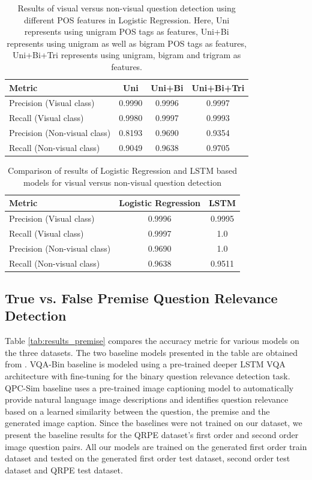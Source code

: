 \begin{table}
  \caption{Results of visual versus non-visual question detection using different POS features in Logistic Regression. Here, Uni represents using unigram POS tags as features, Uni+Bi represents using unigram as well as bigram POS tags as features, Uni+Bi+Tri represents using unigram, bigram and trigram as features.}
  \label{tab:results_visual_lr}
  \begin{tabular}{lccc}
    \toprule
    Metric&Uni&Uni+Bi&Uni+Bi+Tri\\
    \midrule
    Precision (Visual class)&0.9990&0.9996&0.9997\\
    Recall (Visual class)&0.9980&0.9997&0.9993\\
    Precision (Non-visual class)&0.8193&0.9690&0.9354\\
    Recall (Non-visual class)&0.9049&0.9638&0.9705\\
  \bottomrule
\end{tabular}
\end{table}
\begin{table}
  \caption{Comparison of results of Logistic Regression and LSTM based models for visual versus non-visual question detection}
  \label{tab:results_visual}
  \begin{tabular}{lcc}
    \toprule
    Metric&Logistic Regression&LSTM\\
    \midrule
    Precision (Visual class)&0.9996&0.9995\\
    Recall (Visual class)&0.9997&1.0\\
    Precision (Non-visual class)&0.9690&1.0\\
    Recall (Non-visual class)&0.9638&0.9511\\
  \bottomrule
\end{tabular}
\end{table}

\subsection{True vs. False Premise Question Relevance Detection}
Table \ref{tab:results_premise} compares the accuracy metric for various models on the three datasets. The two baseline models presented in the table are obtained from \cite{mahendru2017promise}. VQA-Bin baseline is modeled using a pre-trained deeper LSTM VQA architecture with fine-tuning for the binary question relevance detection task. QPC-Sim baseline uses a pre-trained image captioning model to automatically provide natural language image descriptions
and identifies question relevance based on a learned similarity between the question, the premise and the generated image caption. Since the baselines were not trained on our dataset, we present the baseline results for the QRPE dataset's first order and second order image question pairs. All our models are trained on the generated first order train dataset and tested on the generated first order test dataset, second order test dataset and QRPE test dataset.

